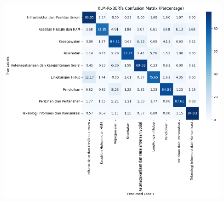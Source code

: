 \documentclass[12pt,a4paper]{article}
\begin{document}
\begin{adjustwidth}
\begin{figure}
\begin{minipage}{0.3\textwidth}
        \label{fig:lstm}
    \end{minipage} \hfill
    \begin{minipage}{0.3\textwidth}
        \centering
        \includegraphics[width=\linewidth]{Image/cm_xlm.png}
        \label{fig:xlm}
    \end{minipage}
    \end{figure}
\end{adjustwidth}
\end{document}

